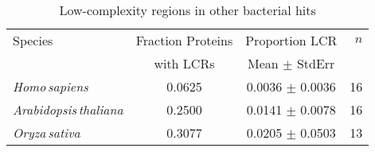 \documentclass[a4paper,12pt]{article}
\newcommand{\arab}{\mbox{\textit{Arabidopsis\,thaliana}}\xspace}
\newcommand{\oryz}{\mbox{\textit{Oryza\,sativa}}\xspace}
\newcommand{\homo}{\mbox{\textit{Homo\,sapiens}}\xspace}
\begin{document}
\begin{multicols}{2}
\begin{table*}
    \caption{Low-complexity regions in other bacterial hits}
    \label{tab:bacterialhits}
    \centering
    \begin{tabular}{lccr}
        \toprule
        Species & Fraction Proteins & \multicolumn{1}{c}{Proportion LCR} & $n$ \\
                & with LCRs         & Mean $\pm$ StdErr &      \\
        \midrule
        \homo & 0.0625 & 0.0036 $\pm$ 0.0036 & 16 \\    %
        \arab & 0.2500 & 0.0141 $\pm$ 0.0078 & 16 \\    %
        \oryz & 0.3077 & 0.0205 $\pm$ 0.0503 & 13 \\    %
        \bottomrule
    \end{tabular}
\end{table*}

%     
% 
% 
% 
%     
% 
% 
% 
%     
% 
% 
% 



\end{multicols}
\end{document}
